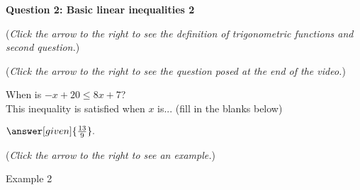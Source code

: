 \documentclass{ximera}
\begin{document}
\textbf{Question 2: Basic linear inequalities 2}
\begin{question}
\begin{flushright}
{\color{blue}(\emph{Click the arrow to the right to see the definition
of trigonometric functions and second question.})}
\end{flushright}
\begin{center}
\begin{expandable}
\begin{flushright}
{\color{blue}(\emph{Click the arrow to the right to see the question
posed at the end of the video.})}
\end{flushright}
\begin{expandable}
When is $-x+20\leq 8x+7$?\\ This inequality is satisfied when $x$ is... (fill in the blanks below)
\begin{prompt}  $\answer[given]{\frac{13}{9}}.$
\end{prompt}
\begin{flushright}
{\color{blue}(\emph{Click the arrow to the right to see an example.})}
\end{flushright}
\begin{expandable}
\begin{center}
Example 2
\end{center}
\end{expandable}
\end{expandable}
\end{expandable}
\end{center}
\end{question}
\end{document}
